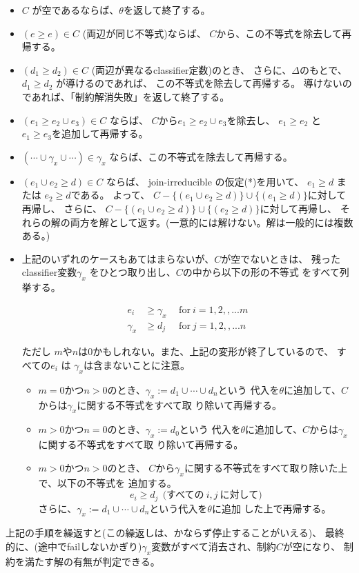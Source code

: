 \documentclass[dvipdfmx]{jsarticle}
\begin{document}
\begin{itemize}
\item $C$ が空であるならば、$\theta$を返して終了する。
\item $(e \ge e) \in C$ (両辺が同じ不等式)ならば、
  $C$から、この不等式を除去して再帰する。
\item $(d_1 \ge d_2) \in C$ (両辺が異なるclassifier定数)のとき、
  さらに、$\Delta$のもとで、$d_1 \ge d_2$ が導けるのであれば、
  この不等式を除去して再帰する。
  導けないのであれば、「制約解消失敗」を返して終了する。
\item $(e_1 \ge e_2 \cup e_3) \in C$ ならば、
  $C$から$e_1 \ge e_2 \cup e_3$を除去し、
  $e_1 \ge e_2$ と $e_1 \ge e_3$を追加して再帰する。
\item $(\cdots \cup \gamma_x \cup \cdots) \in \gamma_x$ %
  ならば、この不等式を除去して再帰する。
\item $(e_1 \cup e_2 \ge d) \in C$ ならば、
  join-irreducible の仮定(*)を用いて、
  $e_1 \ge d$ または $e_2 \ge d$である。
  よって、
  $C - \{(e_1 \cup e_2 \ge d)\} \cup \{(e_1 \ge d)\}$に対して再帰し、
  さらに、
  $C - \{(e_1 \cup e_2 \ge d)\} \cup \{(e_2 \ge d)\}$に対して再帰し、
  それらの解の両方を解として返す。(一意的には解けない。解は一般的には複数ある。)
\item 上記のいずれのケースもあてはまらないが、$C$が空でないときは、
  残ったclassifier変数$\gamma_x$ をひとつ取り出し、$C$の中から以下の形の不等式
  をすべて列挙する。

  \begin{align*}
    e_i & \ge \gamma_x  ~~ & \text{for}~ i=1,2,,...m\\
    \gamma_x & \ge d_j  ~~ & \text{for}~ j=1,2,,...n
  \end{align*}

  ただし $m$や$n$は0かもしれない。また、上記の変形が終了しているので、
  すべての$e_i$ は $\gamma_x$は含まないことに注意。

  \begin{itemize}
  \item $m=0$かつ$n>0$のとき、$\gamma_x:=d_1 \cup \cdots \cup d_n$という
    代入を$\theta$に追加して、$C$からは$\gamma_x$に関する不等式をすべて取
    り除いて再帰する。
  \item $m>0$かつ$n=0$のとき、$\gamma_x:=d_0$という
    代入を$\theta$に追加して、$C$からは$\gamma_x$に関する不等式をすべて取
    り除いて再帰する。
  \item $m>0$かつ$n>0$のとき、
    $C$から$\gamma_x$に関する不等式をすべて取り除いた上で、以下の不等式を
    追加する。
    \[
      e_i \ge d_j   ~~\textrm{(すべての}~i,j~\textrm{に対して)}
    \]
    さらに、$\gamma_x:=d_1 \cup \cdots \cup d_n$という代入を$\theta$に追加
    した上で再帰する。
  \end{itemize}
\end{itemize}

上記の手順を繰返すと(この繰返しは、かならず停止することがいえる)、
最終的に、(途中でfailしないかぎり)$\gamma_x$変数がすべて消去され、制約$C$が空になり、
制約を満たす解の有無が判定できる。
\end{document}
